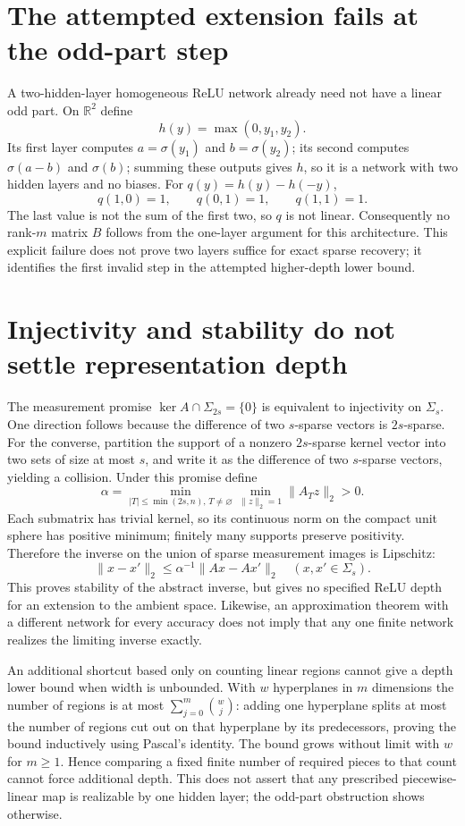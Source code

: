 \documentclass[11pt]{article}
\begin{document}
\section{The attempted extension fails at the odd-part step}
A two-hidden-layer homogeneous ReLU network already need not
have a linear odd part. On $\mathbb R^2$ define
\[
 h(y)=\max(0,y_1,y_2).
\]
Its first layer computes $a=\sigma(y_1)$ and $b=\sigma(y_2)$;
its second computes $\sigma(a-b)$ and $\sigma(b)$; summing
these outputs gives $h$, so it is a network with two hidden
layers and no biases. For $q(y)=h(y)-h(-y)$,
\[
 q(1,0)=1,\qquad q(0,1)=1,\qquad q(1,1)=1.
\]
The last value is not the sum of the first two, so $q$ is
not linear. Consequently no rank-$m$ matrix $B$ follows from
the one-layer argument for this architecture. This explicit
failure does not prove two layers suffice for exact sparse
recovery; it identifies the first invalid step in the attempted
higher-depth lower bound.

\section{Injectivity and stability do not settle representation depth}
The measurement promise
$\ker A\cap\Sigma_{2s}=\{0\}$ is equivalent to injectivity
on $\Sigma_s$. One direction follows because the difference
of two $s$-sparse vectors is $2s$-sparse. For the converse,
partition the support of a nonzero $2s$-sparse kernel vector
into two sets of size at most $s$, and write it as the difference
of two $s$-sparse vectors, yielding a collision.
Under this promise define
\[
 \alpha=\min_{|T|\le\min(2s,n),\,T\ne\varnothing}
          \min_{\|z\|_2=1}\|A_Tz\|_2>0.
\]
Each submatrix has trivial kernel, so its continuous norm on
the compact unit sphere has positive minimum; finitely many
supports preserve positivity. Therefore the inverse on the
union of sparse measurement images is Lipschitz:
\[
 \|x-x'\|_2\le\alpha^{-1}\|Ax-Ax'\|_2
 \quad(x,x'\in\Sigma_s).
\]
This proves stability of the abstract inverse, but gives no
specified ReLU depth for an extension to the ambient space.
Likewise, an approximation theorem with a different network
for every accuracy does not imply that any one finite network
realizes the limiting inverse exactly.

An additional shortcut based only on counting linear regions
cannot give a depth lower bound when width is unbounded.
With $w$ hyperplanes in $m$ dimensions the number of regions
is at most $\sum_{j=0}^m\binom wj$: adding one hyperplane
splits at most the number of regions cut out on that hyperplane
by its predecessors, proving the bound inductively using
Pascal's identity. The bound grows without limit with $w$ for
$m\ge1$. Hence comparing a fixed finite number of required
pieces to that count cannot force additional depth. This does
not assert that any prescribed piecewise-linear map is realizable
by one hidden layer; the odd-part obstruction shows otherwise.
\end{document}
